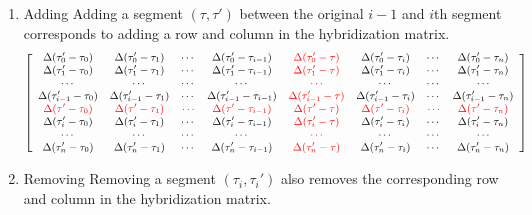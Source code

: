 \begin{enumerate}
\item Adding
Adding a segment $(\tau,\tau')$ between the original $i-1$ and $i$th segment 
corresponds to adding a row and column in the hybridization matrix. 
\begin{equation}
\small
  \label{eq:hyb-matrix-add}
  \left[
    \begin{array}{cccccccc}
      \Delta(\tau_0'-\tau_0) & \Delta(\tau_0'-\tau_1) & \cdots & \Delta(\tau_0'-\tau_{i-1}) &\textcolor{red}{\Delta(\tau_0'-\tau)} & \Delta(\tau_0'-\tau_i)&\cdots & \Delta(\tau_0'-\tau_n)\\
      \Delta(\tau_1'-\tau_0) & \Delta(\tau_1'-\tau_1) & \cdots & \Delta(\tau_1'-\tau_{i-1}) &\textcolor{red}{\Delta(\tau_1'-\tau)} & \Delta(\tau_1'-\tau_i)&\cdots & \Delta(\tau_1'-\tau_n)\\
      \cdots & \cdots & \cdots & \cdots  & \textcolor{red}{\cdots} & \cdots & \cdots & \cdots\\
      \Delta(\tau_{i-1}'-\tau_0) & \Delta(\tau_{i-1}'-\tau_1) & \cdots & \Delta(\tau_{i-1}'-\tau_{i-1}) &\textcolor{red}{\Delta(\tau_{i-1}'-\tau)} & \Delta(\tau_{i-1}'-\tau_i)&\cdots & \Delta(\tau_{i-1}'-\tau_n)\\
      \textcolor{red}{\Delta(\tau'-\tau_0)} &\textcolor{red}{\Delta(\tau'-\tau_1)} & \textcolor{red}{\cdots} & \textcolor{red}{\Delta(\tau'-\tau_{i-1})} &\textcolor{red}{\Delta(\tau'-\tau)} & \textcolor{red}{\Delta(\tau'-\tau_i)}&\textcolor{red}{\cdots} & \textcolor{red}{\Delta(\tau'-\tau_n)}\\
      \Delta(\tau_i'-\tau_0) & \Delta(\tau_i'-\tau_1) & \cdots & \Delta(\tau_i'-\tau_{i-1}) &\textcolor{red}{\Delta(\tau_i'-\tau)} & \Delta(\tau_i'-\tau_i)&\cdots & \Delta(\tau_i'-\tau_n)\\
      \cdots & \cdots & \cdots & \cdots  & \textcolor{red}{\cdots} & \cdots & \cdots & \cdots\\
      \Delta(\tau_n'-\tau_0) & \Delta(\tau_n'-\tau_1) & \cdots & \Delta(\tau_n'-\tau_{i-1}) &\textcolor{red}{\Delta(\tau_n'-\tau)} & \Delta(\tau_n'-\tau_i)&\cdots & \Delta(\tau_n'-\tau_n)\\
    \end{array}
  \right]\end{equation}

\item Removing
Removing a segment $(\tau_i,\tau_i')$ also removes the corresponding row and 
column in the hybridization matrix. 

\end{enumerate}
 
